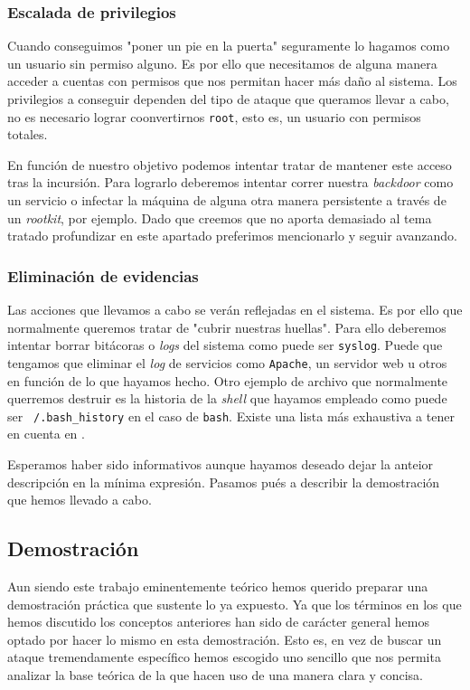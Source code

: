 \documentclass[12pt]{article}
\newcommand{\newpar} {
    \vskip 0.5cm
}
\begin{document}
            \subsubsection{Escalada de privilegios}
                Cuando conseguimos "poner un pie en la puerta" seguramente lo hagamos como un usuario sin permiso alguno. Es por ello que necesitamos de alguna manera acceder a cuentas con permisos que nos permitan hacer más daño al sistema. Los privilegios a conseguir dependen del tipo de ataque que queramos llevar a cabo, no es necesario lograr coonvertirnos \texttt{root}, esto es, un usuario con permisos totales.

                \newpar

                En función de nuestro objetivo podemos intentar tratar de mantener este acceso tras la incursión. Para lograrlo deberemos intentar correr nuestra \textit{backdoor} como un servicio o infectar la máquina de alguna otra manera persistente a través de un \textit{rootkit}, por ejemplo. Dado que creemos que no aporta demasiado al tema tratado profundizar en este apartado preferimos mencionarlo y seguir avanzando.

            \subsubsection{Eliminación de evidencias}
                Las acciones que llevamos a cabo se verán reflejadas en el sistema. Es por ello que normalmente queremos tratar de "cubrir nuestras huellas". Para ello deberemos intentar borrar bitácoras o \textit{logs} del sistema como puede ser \texttt{syslog}. Puede que tengamos que eliminar el \textit{log} de servicios como \texttt{Apache}, un servidor web u otros en función de lo que hayamos hecho. Otro ejemplo de archivo que normalmente querremos destruir es la historia de la \textit{shell} que hayamos empleado como puede ser \texttt{~/.bash\_history} en el caso de \texttt{bash}. Existe una lista más exhaustiva a tener en cuenta en \cite{bib:log_files}.

            \newpar

            Esperamos haber sido informativos aunque hayamos deseado dejar la anteior descripción en la mínima expresión. Pasamos pués a describir la demostración que hemos llevado a cabo.

        \subsection{Demostración}
            Aun siendo este trabajo eminentemente teórico hemos querido preparar una demostración práctica que sustente lo ya expuesto. Ya que los términos en los que hemos discutido los conceptos anteriores han sido de carácter general hemos optado por hacer lo mismo en esta demostración. Esto es, en vez de buscar un ataque tremendamente específico hemos escogido uno sencillo que nos permita analizar la base teórica de la que hacen uso de una manera clara y concisa.
\end{document}
